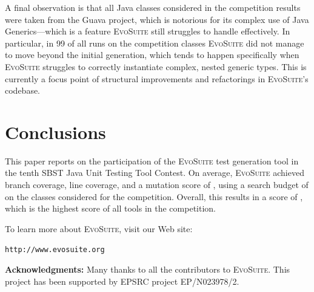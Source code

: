 \documentclass[10pt,conference]{IEEEtran}
\newcommand{\EVOSUITE}{\textsc{EvoSuite}\xspace}
\begin{document}
A final observation is that all \cuts Java classes considered in the competition
results were taken from the Guava project, which is notorious for its complex
use of Java Generics---which is a feature \EVOSUITE still struggles to handle
effectively. In particular, in 99 of all runs on the \cuts competition classes
\EVOSUITE did not manage to move beyond the initial generation, which tends to
happen specifically when \EVOSUITE struggles to correctly instantiate complex,
nested generic types. This is currently a focus point of structural
improvements and refactorings in \EVOSUITE's codebase.






\section{Conclusions}

This paper reports on the participation of the \EVOSUITE test generation tool
in the tenth SBST Java Unit Testing Tool Contest. On average, \EVOSUITE achieved
\avgConditionsCoverageRatioLong branch coverage, \avgLinesCoverageRatioLong line coverage, 
and a mutation score of \avgMutantsCoverageRatioLong, using a
search budget of \budgetLong on the \cuts classes considered for the competition.
Overall, this results in a score of \score, which is the highest score of all
tools in the competition.


To learn more about \EVOSUITE, visit our Web site:
\begin{center}
\texttt{http://www.evosuite.org}
\end{center}



\textbf{Acknowledgments:} Many thanks to all the contributors to
\EVOSUITE.
This project has been supported by EPSRC project %
EP/N023978/2.




\balance
\end{document}

